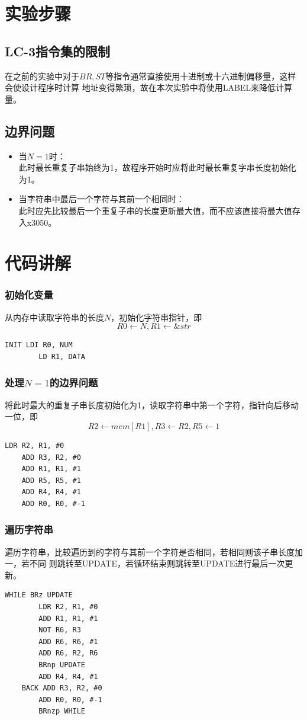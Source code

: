 \documentclass[12pt, a4paper, oneside]{ctexart}
\begin{document}
\section*{实验步骤}
\subsection*{LC-3指令集的限制}
在之前的实验中对于$BR,ST$等指令通常直接使用十进制或十六进制偏移量，这样会使设计程序时计算
地址变得繁琐，故在本次实验中将使用LABEL来降低计算量。
\subsection*{边界问题}
\begin{itemize}
    \item 当$N=1$时：\\
    此时最长重复子串始终为1，故程序开始时应将此时最长重复字串长度初始化为1。
    \item 当字符串中最后一个字符与其前一个相同时：\\
    此时应先比较最后一个重复子串的长度更新最大值，而不应该直接将最大值存入x3050。
\end{itemize}

\section*{代码讲解}
\subsubsection*{初始化变量}
从内存中读取字符串的长度$N$，初始化字符串指针，即
$$R0 \leftarrow N, R1 \leftarrow \& str$$
\begin{lstlisting}[name = code, firstnumber = 1]
    INIT LDI R0, NUM
        LD R1, DATA
\end{lstlisting}
\subsubsection*{处理$N=1$的边界问题}
将此时最大的重复子串长度初始化为1，读取字符串中第一个字符，指针向后移动一位，即
$$R2 \leftarrow mem[R1], R3 \leftarrow R2, R5 \leftarrow 1$$
\begin{lstlisting}[name = code, firstnumber = last]
    LDR R2, R1, #0
    ADD R3, R2, #0
    ADD R1, R1, #1
    ADD R5, R5, #1
    ADD R4, R4, #1
    ADD R0, R0, #-1
\end{lstlisting}
\subsubsection*{遍历字符串}
遍历字符串，比较遍历到的字符与其前一个字符是否相同，若相同则该子串长度加一，若不同
则跳转至UPDATE，若循环结束则跳转至UPDATE进行最后一次更新。
\begin{lstlisting}[name = code, firstnumber = last]
    WHILE BRz UPDATE
        LDR R2, R1, #0
        ADD R1, R1, #1
        NOT R6, R3
        ADD R6, R6, #1
        ADD R6, R2, R6
        BRnp UPDATE
        ADD R4, R4, #1
    BACK ADD R3, R2, #0
        ADD R0, R0, #-1
        BRnzp WHILE
\end{lstlisting}
\end{document}
